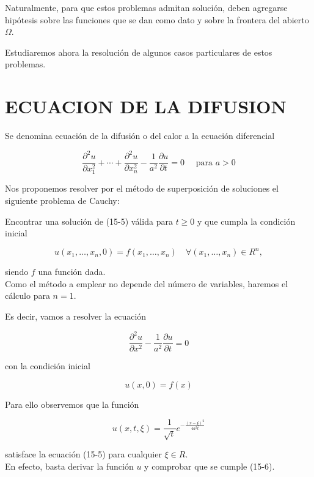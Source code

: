 \documentclass[10pt]{article}
\theoremstyle{plain}
\theoremstyle{definition}
\theoremstyle{remark}
\begin{document}
Naturalmente, para que estos problemas admitan solución, deben agregarse hipótesis sobre las funciones que se dan como dato y sobre la frontera del abierto $\Omega$.

Estudiaremos ahora la resolución de algunos casos particulares de estos problemas.

\section*{ECUACION DE LA DIFUSION}
Se denomina ecuación de la difusión o del calor a la ecuación diferencial


\begin{equation*}
\frac{\partial^{2} u}{\partial x_{1}^{2}}+\cdots+\frac{\partial^{2} u}{\partial x_{n}^{2}}-\frac{1}{a^{2}} \frac{\partial u}{\partial t}=0 \quad \text { para } a>0 \tag{15-5}
\end{equation*}


Nos proponemos resolver por el método de superposición de soluciones el siguiente problema de Cauchy:

Encontrar una solución de (15-5) válida para $t \geqslant 0$ y que cumpla la condición inicial

$$
u\left(x_{1}, \ldots, x_{n}, 0\right)=f\left(x_{1}, \ldots, x_{n}\right) \quad \forall\left(x_{1}, \ldots, x_{n}\right) \in R^{n},
$$

siendo $f$ una función dada.\\
Como el método a emplear no depende del número de variables, haremos el cálculo para $n=1$.

Es decir, vamos a resolver la ecuación


\begin{equation*}
\frac{\partial^{2} u}{\partial x^{2}}-\frac{1}{a^{2}} \frac{\partial u}{\partial t}=0 \tag{$15\cdot6$}
\end{equation*}


con la condición inicial

$$
u(x, 0)=f(x)
$$

Para ello observemos que la función


\begin{equation*}
u(x, t, \xi)=\frac{1}{\sqrt{t}} e^{-\frac{(x-\xi)^{2}}{4 a^{2} t}} \tag{15-7}
\end{equation*}


satisface la ecuación (15-5) para cualquier $\xi \in R$.\\
En efecto, basta derivar la función $u$ y comprobar que se cumple (15-6).
\end{document}
